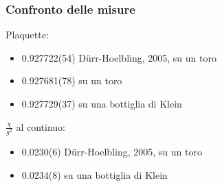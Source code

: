 \begin{frame}
    \frametitle{Confronto delle misure}
    {\color{fzjblue}Plaquette:}
    \begin{itemize}
		\item 0.927722(54) Dürr-Hoelbling, 2005, su un toro
		\item 0.927681(78) su un toro
		\item 0.927729(37) su una bottiglia di Klein
    \end{itemize}
    \vspace{0.5em}
    {\color{fzjblue}$\displaystyle \frac{\chi}{g^2}$ al continuo:}
    \begin{itemize}
        \item 0.0230(6) Dürr-Hoelbling, 2005, su un toro
        \item 0.0234(8) su una bottiglia di Klein
    \end{itemize}
\end{frame}

